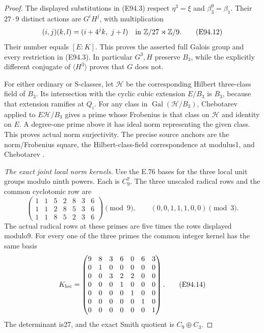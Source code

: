 \begin{proof}
The displayed substitutions in (E94.3) respect
\(\eta^3=\xi\) and \(\beta_3^9=\beta_1\).
Their \(27\cdot9\) distinct actions are
\(G^iH^j\), with multiplication
\[
 (i,j)(k,l)=(i+4^j k,\ j+l)
       \quad\hbox{in }\mathbb Z/27\rtimes\mathbb Z/9.
 \tag{E94.12}
\]
Their number equals \([E:K]\). This proves the
asserted full Galois group and every restriction
in (E94.3). In particular \(G^3,H\) preserve
\(B_3\), while the explicitly different conjugate
of \(\langle H^3\rangle\) proves that \(G\)
does not.

For either ordinary or S-classes, let \(\mathcal H\)
be the corresponding Hilbert three-class field
of \(B_3\). Its intersection with the cyclic cubic
extension \(E/B_3\) is \(B_3\), because that
extension ramifies at \(Q_i\).
For any class in \(\operatorname{Gal}(\mathcal H/B_3)\),
Chebotarev applied to \(E\mathcal H/B_3\) gives a
prime whose Frobenius is that class on \(\mathcal H\)
and identity on \(E\). A degree-one prime above it
has ideal norm representing the given class.
This proves actual norm surjectivity. The precise
source anchors are the norm/Frobenius square,
the Hilbert-class-field correspondence at modulus1,
and Chebotarev
\cite[V,Proposition3.3,Theorem3.6 and Example3.9;
VIII,Theorem7.4]{E_MilneCFT}.

\emph{The exact joint local norm kernels.}
Use the E.76 bases for the three local unit
groups modulo ninth powers. Each is \(C_9^7\).
The three unscaled radical rows and the common
cyclotomic row are
\[
 \begin{pmatrix}
 1&1&5&2&8&3&6\\
 1&1&2&8&5&3&6\\
 1&1&8&5&2&3&6
 \end{pmatrix}\pmod9,\qquad
       (0,0,1,1,1,0,0)\pmod3 .
 \tag{E94.13}
\]
The actual radical rows at these primes are five
times the rows displayed modulo9. For every one
of the three primes the common integer kernel
has the same basis
\[
 K_{\rm loc}=
 \begin{pmatrix}
 9&8&3&6&0&6&3\\
 0&1&0&0&0&0&0\\
 0&0&3&2&2&0&0\\
 0&0&0&1&0&0&0\\
 0&0&0&0&1&0&0\\
 0&0&0&0&0&1&0\\
 0&0&0&0&0&0&1
 \end{pmatrix}.
 \tag{E94.14}
\]
The determinant is27, and the exact Smith quotient
is \(C_9\oplus C_3\).


\end{proof}
